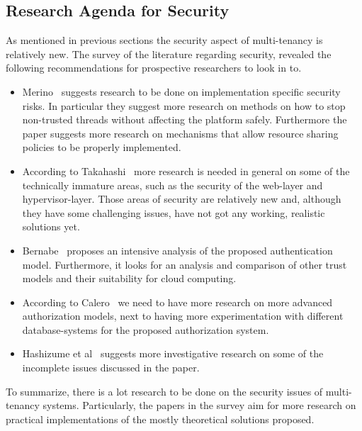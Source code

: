 \subsection{Research Agenda for Security}
As mentioned in previous sections the security aspect of multi-tenancy is relatively new.
The survey of the literature regarding security, revealed the following recommendations for prospective researchers to look in to. 
\begin{itemize}
    \item Merino~\cite{Merino2011Security} suggests research to be done on implementation specific security risks. In particular they suggest more research on methods on how to stop non-trusted threads without affecting the platform safely. Furthermore the paper suggests more research on mechanisms that allow resource sharing policies to be properly implemented.
    \item According to Takahashi~\cite{Takahashi2012Security} more research is needed in general on some of the technically immature areas, such as the security of the web-layer and hypervisor-layer.
Those areas of security are relatively new and, although they have some challenging issues, have not got any working, realistic solutions yet.
    \item Bernabe~\cite{Bernabe2012Auth} proposes an intensive analysis of the proposed authentication model.
Furthermore, it looks for an analysis and comparison of other trust models and their suitability for cloud computing.
    \item According to Calero~\cite{Calero2010Auth} we need to have more research on more advanced authorization models, next to having more experimentation with different database-systems for the proposed authorization system.
    \item Hashizume et al~\cite{Hashizume2013Security} suggests more investigative research on some of the incomplete issues discussed in the paper.
\end{itemize}
To summarize, there is a lot research to be done on the security issues of multi-tenancy systems.
Particularly, the papers in the survey aim for more research on practical implementations of the mostly theoretical solutions proposed.
